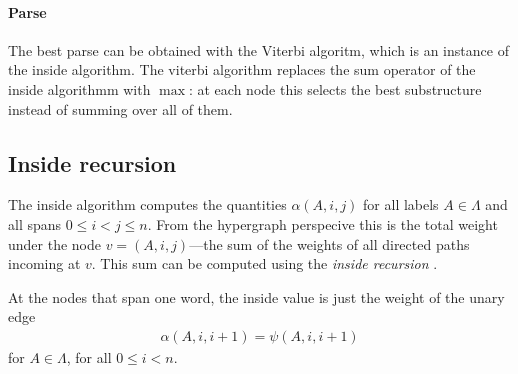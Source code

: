   \paragraph{Parse}
    The best parse can be obtained with the Viterbi algoritm, which is an instance of the inside algorithm. The viterbi algorithm replaces the sum operator of the inside algorithmm with $\max$: at each node this selects the best substructure instead of summing over all of them.

\subsection{Inside recursion}
  The inside algorithm computes the quantities $\alpha(A,i,j)$ for all labels $A \in \Lambda$ and all spans $0 \leq i < j \leq n$. From the hypergraph perspecive this is the total weight under the node $v = (A, i, j)$---the sum of the weights of all directed paths incoming at $v$. This sum can be computed using the \textit{inside recursion} \citep{goodman1999semiring}.

  At the nodes that span one word, the inside value is just the weight of the unary edge
  \begin{align}
      \label{eq:inside-base}
      \alpha(A, i, i+1) = \psi(A, i, i+1)
  \end{align}
  for $A \in \Lambda$, for all $0 \leq i < n$.

